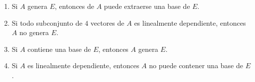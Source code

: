 \documentclass[12pt]{article}
\begin{document}
\begin{enumerate}
    \item Si \(A\) genera \(E\), entonces de \(A\) puede extraerse una base de \(E\).
    \item Si todo subconjunto de \(4\) vectores de \(A\) es linealmente dependiente, entonces \(A\) no genera \(E\).
    \item Si \(A\) contiene una base de \(E\), entonces \(A\) genera \(E\).
    \item Si \(A\) es linealmente dependiente, entonces \(A\) no puede contener una base de \(E\).
\end{enumerate}
\end{document}
